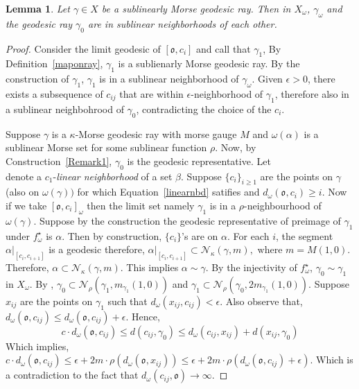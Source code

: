 \documentclass[12 pt]{amsart}
\newcommand{\calN}{\mathcal{N}}
\newcommand{\gothic}{\mathfrak}
\newcommand{\go}{{\gothic o}}
\newtheorem{lemma}[theorem]{Lemma}
\theoremstyle{definition}
\theoremstyle{remark}
\newcommand{\ep}{\epsilon}
\begin{document}
\begin{lemma} \label{kappaboundinFPP}
Let $\gamma \in X$ be a sublinearly Morse geodesic ray. Then in $X_\omega$, $\gamma_\omega$ and the geodesic ray $\gamma_0$ are in sublinear neighborhoods of each other.
\end{lemma}
\begin{proof}
Consider the limit geodesic of $[\go, c_i]$ and call that $\gamma_1$,  By Definition~\ref{maponray},  $\gamma_1$ is a sublienarly Morse geodesic ray. By the construction of  $\gamma_1$, $\gamma_1$ is in a sublinear neighborhood of $\gamma_\omega$. Given $\ep>0$, there exists a subsequence of $c_{ij}$ that are within $\ep$-neighborhood of $\gamma_1$, therefore also in a sublinear neighbohrood of $\gamma_0$, contradicting the choice of the $c_i$.

Suppose $\gamma$ is a $\kappa$-Morse geodesic ray with morse gauge $M$ and $\omega(\alpha)$ is a sublinear Morse set for some sublinear function $\rho$. Now, by Construction~\ref{Remark1}, $\gamma_0$ is the geodesic representative. Let 
\begin{equation}\label{linearnbd} 
  \end{equation}
  denote a $c_1$-\emph{linear neighborhood} of a set $\beta$.
Suppose $\{c_i\}_{i\geq1}$ are the points on $\gamma$ (also on $\omega(\gamma))$ for which Equation~\ref{linearnbd} satifies and $d_\omega(\go,c_{i})\geq i$. Now if we take $[\go,c_i]_\omega$ then the limit set namely $\gamma_1$ is in a $\rho$-neighbourhood of $\omega(\gamma).$ Suppose by the construction the geodesic representative of preimage of $\gamma_1$ under $f_\omega^\star$ is $\alpha$. Then by construction, $\{c_i\}$'s are on $\alpha$. For each $i$, the segment $\alpha|_{[c_i,c_{i+1}]}$ is a geodesic therefore, $\alpha|_{[c_i,c_{i+1}]} \subset \calN_\kappa(\gamma, m), \text{ where $m=M(1,0)$}$. Therefore, $\alpha \subset  \calN_\kappa(\gamma, m)$. This implies $\alpha \sim \gamma$. By the injectivity of $ f_\omega^\star$, $\gamma_0 \sim \gamma_1$ in $X_\omega$. By \cite[Lemma 3.4]{QRT2}, $\gamma_0 \subset \calN_\rho(\gamma_1, m_{\gamma_1}(1,0))$ and $\gamma_1 \subset\calN_\rho(\gamma_0, 2m_{\gamma_1}(1,0))$.
\newline Suppose $x_{ij}$ are the points on $\gamma_1$ such that $d_\omega(x_{ij},c_{ij}) <\epsilon$. Also observe that, $d_\omega(\go,c_{ij})\leq d_\omega(\go,c_{ij})+ \epsilon$.
Hence,
\[c\cdot d_\omega(\go,c_{ij}) \leq d(c_{ij}, \gamma_0) \leq d_\omega(c_{ij},x_{ij})+d(x_{ij},\gamma_0)\]
Which implies, $c\cdot d_\omega(\go,c_{ij}) \leq \epsilon+2m \cdot \rho(d_\omega(\go,x_{ij}))\leq  \epsilon+2m \cdot \rho(d_\omega(\go,c_{ij})+ \epsilon)$. Which is a contradiction to the fact that $d_\omega(c_{ij},\go)\rightarrow \infty$.

\end{proof}
\end{document}
